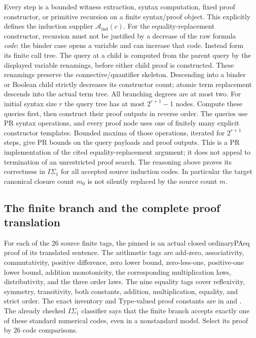 Every step is a bounded witness extraction, syntax computation, fixed
proof constructor, or primitive recursion on a finite syntax/proof object.
This explicitly defines the induction supplier $\mathcal A_{\mathrm{ind}}(c)$.
For the equality-replacement constructor, recursion must not be justified
by a decrease of the raw formula \emph{code}: the binder case opens a
variable and can increase that code.  Instead form its finite call tree.
The query at a child is computed from the parent query by the displayed
variable renamings, before either child proof is constructed.  These
renamings preserve the connective/quantifier skeleton.  Descending into
a binder or Boolean child strictly decreases its constructor count;
atomic term replacement descends into the actual term tree.  All branching
degrees are at most two.  For initial syntax size $r$ the query tree has
at most $2^{r+1}-1$ nodes.  Compute these queries first, then construct
their proof outputs in reverse order.  The queries use PR syntax
operations, and every proof node uses one of finitely many explicit
constructor templates.  Bounded maxima of those operations, iterated for
$2^{r+1}$ steps, give PR bounds on the query payloads and proof outputs.
This is a PR implementation of the cited equality-replacement argument;
it does not appeal to termination of an unrestricted proof search.
The reasoning above proves its correctness in $I\Sigma_1$ for all accepted
source induction codes.  In particular the target canonical closure count
$m_0$ is not silently replaced by the source count $m$.

\subsection{The finite branch and the complete proof translation}

For each of the 26 source finite tags, the pinned
 is an actual closed ordinaryPAeq proof of its
translated sentence.  The arithmetic tags are add-zero, associativity,
commutativity, positive difference, zero lower bound, zero-less-one,
positive-one lower bound, addition monotonicity, the corresponding
multiplication laws, distributivity, and the three order laws.  The nine
equality tags cover reflexivity, symmetry, transitivity, both constants,
addition, multiplication, equality, and strict order.  The exact inventory
and Type-valued proof constants are in
 and
.
The already checked $I\Sigma_1$ classifier says that the finite branch
accepts exactly one of these standard numerical codes, even in a
nonstandard model.  Select its proof by 26 code comparisons.

